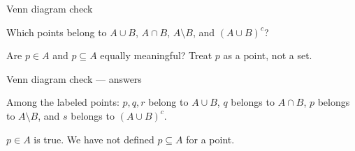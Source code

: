 \documentclass{beamer}
\newcommand{\vennbase}{
 \draw[thick] (-2.7,-1.65) rectangle (2.7,1.65);
 \draw[thick] (-.8,0) circle (1.2);
 \draw[thick] (.8,0) circle (1.2);
 \node at (-1.45,1.25) {$A$}; \node at (1.45,1.25) {$B$};
 \node at (-2.4,1.38) {$U$};}
\begin{document}
\begin{frame}{Venn diagram check}
\begin{center}\end{center}
Which points belong to $A\cup B$, $A\cap B$, $A\setminus B$, and $(A\cup B)^c$?
\medskip\par Are $p\in A$ and $p\subseteq A$ equally meaningful? Treat $p$ as a point, not a set.
\end{frame}
\begin{frame}{Venn diagram check --- answers}
\begin{center}\end{center}
Among the labeled points: $p,q,r$ belong to $A\cup B$, $q$ belongs to $A\cap B$, $p$ belongs to $A\setminus B$, and $s$ belongs to $(A\cup B)^c$.
\medskip\par $p\in A$ is true. We have not defined $p\subseteq A$ for a point.
\end{frame}
\end{document}
